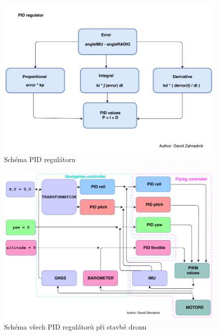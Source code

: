 \begin{figure}[H]
	\centering
	\includegraphics[width=15cm]{pictures/PIDDiagram.pdf}
	\caption{Schéma PID regulátoru}
\end{figure}

\begin{figure}[H]
	\centering
	\includegraphics[width=15cm]{pictures/PIDsDiagram.pdf}
	\caption{Schéma všech PID regulátorů při stavbě dronu}
\end{figure}


